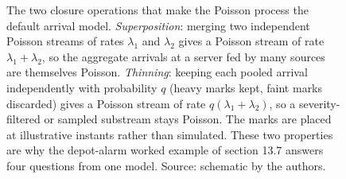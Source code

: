 \begin{figure}[htbp]
\begin{tikzpicture}[x=1cm, y=1cm, font=\small,
  mark/.style={engblack, thick}]
\end{tikzpicture}
\caption[Poisson superposition and thinning]{The two closure
operations that make the Poisson process the default arrival model.
\emph{Superposition}: merging two independent Poisson streams of rates
$\lambda_1$ and $\lambda_2$ gives a Poisson stream of rate
$\lambda_1+\lambda_2$, so the aggregate arrivals at a server fed by many
sources are themselves Poisson. \emph{Thinning}: keeping each pooled
arrival independently with probability $q$ (heavy marks kept, faint
marks discarded) gives a Poisson stream of rate $q(\lambda_1+\lambda_2)$,
so a severity-filtered or sampled substream stays Poisson. The marks are
placed at illustrative instants rather than simulated. These two
properties are why the depot-alarm worked example of section 13.7
answers four questions from one model. Source: schematic by the
authors.}
\label{fig:vol02ch13:poisson-superposition}
\end{figure}

